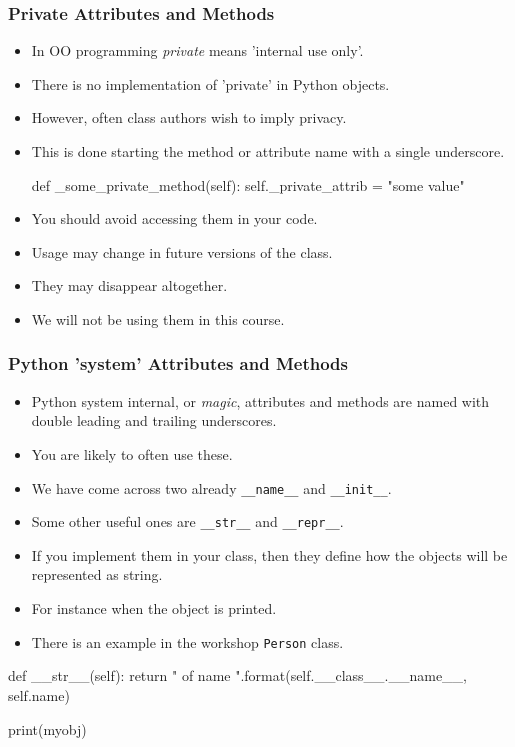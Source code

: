 \documentclass{beamer}
\begin{document}
\begin{frame}[fragile]
\frametitle{Private Attributes and Methods}

\begin{itemize}
\item In OO programming \emph{private} means 'internal use only'.
\item There is no implementation of 'private' in Python objects.
\item However, often class authors wish to imply privacy.
\item This is done starting the method or attribute name with a single underscore.
\begin{code}
  def _some_private_method(self):
    self._private_attrib = "some value"
\end{code}

\item You should avoid accessing them in your code.
\item Usage may change in future versions of the class.
\item They may disappear altogether.
\item We will not be using them in this course.
\end{itemize}

\end{frame}

\begin{frame}[fragile]
\frametitle{Python 'system' Attributes and Methods}
\begin{itemize}
\item Python system internal, or \emph{magic}, attributes and methods are
named with double leading and trailing underscores.
\item You are likely to often use these.
\item We have come across two already \lstinline|__name__| and \lstinline|__init__|.
\item Some other useful ones are \lstinline|__str__| and \lstinline|__repr__|.
\item If you implement them in your class, then they define how the objects will be represented as string.
\item For instance when the object is printed.
\item There is an example in the workshop \lstinline|Person| class.
\end{itemize}
\begin{code}
  def __str__(self):
    return "{} of name {}".format(self.__class__.__name__, 
                              self.name)
		
print(myobj)
\end{code}
\end{frame}
\end{document}
